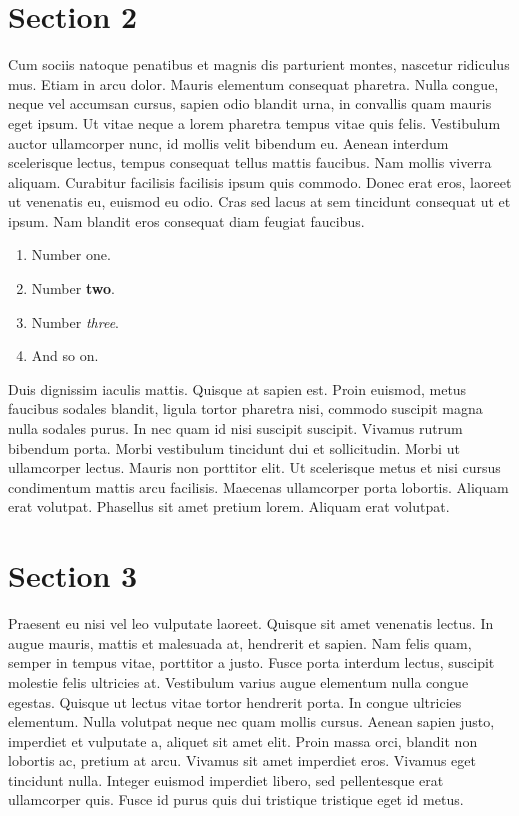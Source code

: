 \documentclass[letterpaper,10pt,twocolumn]{article}
\begin{document}
\section{Section 2}
Cum sociis natoque penatibus et magnis dis parturient montes, nascetur ridiculus mus. Etiam in arcu dolor. Mauris elementum consequat pharetra. Nulla congue, neque vel accumsan cursus, sapien odio blandit urna, in convallis quam mauris eget ipsum. Ut vitae neque a lorem pharetra tempus vitae quis felis. Vestibulum auctor ullamcorper nunc, id mollis velit bibendum eu. Aenean interdum scelerisque lectus, tempus consequat tellus mattis faucibus. Nam mollis viverra aliquam. Curabitur facilisis facilisis ipsum quis commodo. Donec erat eros, laoreet ut venenatis eu, euismod eu odio. Cras sed lacus at sem tincidunt consequat ut et ipsum. Nam blandit eros consequat diam feugiat faucibus.

\begin{enumerate}
  \item{Number one.}
  \item{Number \textbf{two}.}
  \item{Number \emph{three}.}
  \item{And so on.}
\end{enumerate}

Duis dignissim iaculis mattis. Quisque at sapien est. Proin euismod, metus faucibus sodales blandit, ligula tortor pharetra nisi, commodo suscipit magna nulla sodales purus. In nec quam id nisi suscipit suscipit. Vivamus rutrum bibendum porta. Morbi vestibulum tincidunt dui et sollicitudin. Morbi ut ullamcorper lectus. Mauris non porttitor elit. Ut scelerisque metus et nisi cursus condimentum mattis arcu facilisis. Maecenas ullamcorper porta lobortis. Aliquam erat volutpat. Phasellus sit amet pretium lorem. Aliquam erat volutpat.

\section{Section 3}
Praesent eu nisi vel leo vulputate laoreet. Quisque sit amet venenatis lectus. In augue mauris, mattis et malesuada at, hendrerit et sapien. Nam felis quam, semper in tempus vitae, porttitor a justo. Fusce porta interdum lectus, suscipit molestie felis ultricies at. Vestibulum varius augue elementum nulla congue egestas. Quisque ut lectus vitae tortor hendrerit porta. In congue ultricies elementum. Nulla volutpat neque nec quam mollis cursus. Aenean sapien justo, imperdiet et vulputate a, aliquet sit amet elit. Proin massa orci, blandit non lobortis ac, pretium at arcu. Vivamus sit amet imperdiet eros. Vivamus eget tincidunt nulla. Integer euismod imperdiet libero, sed pellentesque erat ullamcorper quis. Fusce id purus quis dui tristique tristique eget id metus.
\end{document}
